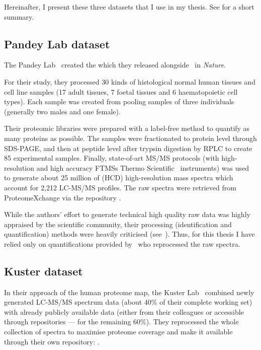 Hereinafter, I present these three datasets that I use in my thesis.
See  for a short summary.\mybr\

\subsection{Pandey Lab dataset}

The Pandey Lab~ created the
 which
they released alongside~ in \emph{Nature}.\mybr\

For their study, they processed 30 kinds of histological normal human
tissues and cell line samples (17 adult tissues, 7 foetal tissues and 6
haematopoietic cell types).
Each sample was created from pooling samples of three
individuals (generally two males and one female).\mybr\

Their proteomic libraries were prepared with a label-free method to quantify
as many proteins as possible.
The samples were fractionated to protein level through \gls{SDS-PAGE},
and then at peptide level after trypsin digestion by \gls{RPLC}
to create 85 experimental samples.
Finally, state-of-art \gls{MS/MS} protocols
(with high-resolution and high accuracy
\glspl{FTMS} Thermo Scientific \orbi\ instruments)
was used to generate about 25 million of (\gls{HCD})
high-resolution mass spectra which account for 2,212 \gls{LC-MS/MS} profiles.
The raw spectra were retrieved from ProteomeXchange via the repository
.\mybr\

While the authors' effort to generate technical high quality raw data was highly
appraised by the scientific community, their processing
(identification and quantification) methods were heavily
criticised (see~\citet{Ezkurdia2014-qx,Deutsch2015}).
Thus, for this thesis I have relied only on
quantifications provided by \james\ who reprocessed the raw spectra.\mybr\

\subsection{Kuster dataset}

In their approach of the human proteome map, the Kuster Lab~
combined newly generated \gls{LC-MS/MS} spectrum data (about 40\% of their
complete working set) with already publicly available data
(either from their colleagues or accessible through repositories
--- for the remaining 60\%).
They reprocessed
the whole collection of spectra to maximise proteome coverage
and make it available through their own repository:
.\mybr\

